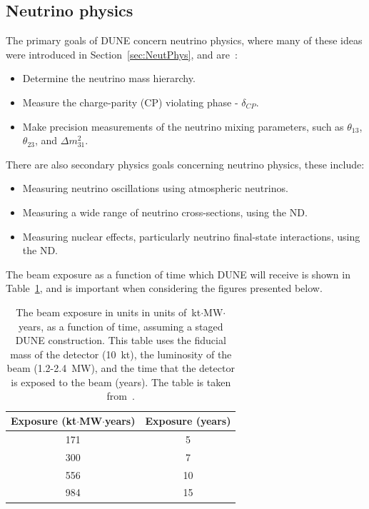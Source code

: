 \subsection{Neutrino physics} \label{sec:DUNEPhys_Neut} %
The primary goals of DUNE concern neutrino physics, where many of these ideas were introduced in Section~\ref{sec:NeutPhys}, and are~\citep{DUNECDR_V2}:
\begin{itemize}
\item Determine the neutrino mass hierarchy.
\item Measure the charge-parity (CP) violating phase - $\delta_{CP}$.
\item Make precision measurements of the neutrino mixing parameters, such as $\theta_{13}$, $\theta_{23}$, and $\Delta m^{2}_{31}$.
\end{itemize}
There are also secondary physics goals concerning neutrino physics, these include:
\begin{itemize}
\item Measuring neutrino oscillations using atmospheric neutrinos.
\item Measuring a wide range of neutrino cross-sections, using the ND.
\item Measuring nuclear effects, particularly neutrino final-state interactions, using the ND.
\end{itemize}
The beam exposure as a function of time which DUNE will receive is shown in Table~\ref{tab:DUNEExposure}, and is important when considering the figures presented below. \\

\begin{table}
\caption[The beam exposure in units in units of~kt$\cdot$MW$\cdot$years, as a function of time, assuming a staged DUNE construction]
        {The beam exposure in units in units of~kt$\cdot$MW$\cdot$years, as a function of time, assuming a staged DUNE construction. This table uses the fiducial mass of the detector (10~kt), the luminosity of the beam (1.2-2.4~MW), and the time that the detector is exposed to the beam (years). The table is taken from~\citep{Elizabeth_01_17}.}
\centering
\label{tab:DUNEExposure}
\begin{tabular}{c c}
\toprule
{Exposure (kt$\cdot$MW$\cdot$years)} & {Exposure (years)} \\
\midrule
171                      & 5 \\

300                      & 7 \\

556                      & 10 \\

984                      & 15 \\
\bottomrule
\end{tabular}
\end{table}

